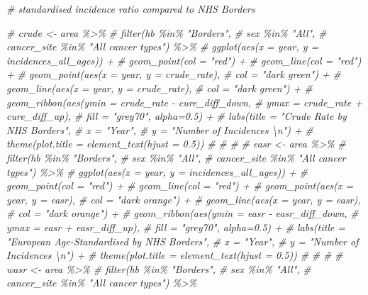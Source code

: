 \documentclass[
]{article}
\newenvironment{Shaded}{\begin{snugshade}}{\end{snugshade}}
\newcommand{\CommentTok}[1]{\textcolor[rgb]{0.56,0.35,0.01}{\textit{#1}}}
\begin{document}
\begin{Shaded}
\begin{Highlighting}[]
\CommentTok{\# standardised incidence ratio compared to NHS Borders}

\CommentTok{\# crude \textless{}{-} area \%\textgreater{}\% }
\CommentTok{\#   filter(hb \%in\% "Borders",}
\CommentTok{\#          sex \%in\% "All",}
\CommentTok{\#          cancer\_site \%in\% "All cancer types") \%\textgreater{}\% }
\CommentTok{\#   ggplot(aes(x = year, y = incidences\_all\_ages)) +}
\CommentTok{\#   geom\_point(col = "red") +}
\CommentTok{\#   geom\_line(col = "red") +}
\CommentTok{\#   geom\_point(aes(x = year, y = crude\_rate),}
\CommentTok{\#              col = "dark green") +}
\CommentTok{\#   geom\_line(aes(x = year, y = crude\_rate),}
\CommentTok{\#             col = "dark green") +}
\CommentTok{\#   geom\_ribbon(aes(ymin = crude\_rate {-} cure\_diff\_down, }
\CommentTok{\#                   ymax = crude\_rate + cure\_diff\_up), }
\CommentTok{\#               fill = "grey70", alpha=0.5) +}
\CommentTok{\#   labs(title = "Crude Rate by NHS Borders",}
\CommentTok{\#        x = "Year",}
\CommentTok{\#        y = "Number of Incidences \textbackslash{}n") +}
\CommentTok{\#   theme(plot.title = element\_text(hjust = 0.5))}
\CommentTok{\# }
\CommentTok{\# }
\CommentTok{\# }
\CommentTok{\# easr \textless{}{-} area \%\textgreater{}\% }
\CommentTok{\#   filter(hb \%in\% "Borders",}
\CommentTok{\#          sex \%in\% "All",}
\CommentTok{\#          cancer\_site \%in\% "All cancer types") \%\textgreater{}\% }
\CommentTok{\#   ggplot(aes(x = year, y = incidences\_all\_ages)) +}
\CommentTok{\#   geom\_point(col = "red") +}
\CommentTok{\#   geom\_line(col = "red") +}
\CommentTok{\#   geom\_point(aes(x = year, y = easr),}
\CommentTok{\#              col = "dark orange") +}
\CommentTok{\#   geom\_line(aes(x = year, y = easr),}
\CommentTok{\#             col = "dark orange") +}
\CommentTok{\#   geom\_ribbon(aes(ymin = easr {-} easr\_diff\_down, }
\CommentTok{\#                   ymax = easr + easr\_diff\_up), }
\CommentTok{\#               fill = "grey70", alpha=0.5) +}
\CommentTok{\#   labs(title = "European Age{-}Standardised by NHS Borders",}
\CommentTok{\#        x = "Year",}
\CommentTok{\#        y = "Number of Incidences \textbackslash{}n") +}
\CommentTok{\#   theme(plot.title = element\_text(hjust = 0.5))}
\CommentTok{\# }
\CommentTok{\# }
\CommentTok{\# }
\CommentTok{\# wasr \textless{}{-} area \%\textgreater{}\% }
\CommentTok{\#   filter(hb \%in\% "Borders",}
\CommentTok{\#          sex \%in\% "All",}
\CommentTok{\#          cancer\_site \%in\% "All cancer types") \%\textgreater{}\% }

\end{Highlighting}
\end{Shaded}
\end{document}
